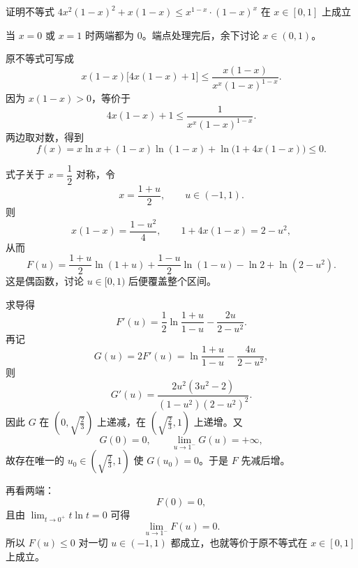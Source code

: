 \begin{example}[虚调子]
证明不等式 $4x^2(1-x)^2 + x(1-x) \leqslant x^{1-x}\cdot(1-x)^x$ 在 $x \in [0, 1]$ 上成立
\end{example}
\begin{solution}
当 \(x=0\) 或 \(x=1\) 时两端都为 \(0\)。端点处理完后，余下讨论 \(x\in(0,1)\)。

原不等式可写成
\[
x(1-x)\bigl[4x(1-x)+1\bigr]\le \frac{x(1-x)}{x^x(1-x)^{1-x}}.
\]
因为 \(x(1-x)>0\)，等价于
\[
4x(1-x)+1\le \frac1{x^x(1-x)^{1-x}}.
\]
两边取对数，得到
\[
f(x)=x\ln x+(1-x)\ln(1-x)+\ln\bigl(1+4x(1-x)\bigr)\le0.
\]

式子关于 \(x=\dfrac12\) 对称，令
\[
x=\frac{1+u}{2},\qquad u\in(-1,1).
\]
则
\[
x(1-x)=\frac{1-u^2}{4},\qquad 1+4x(1-x)=2-u^2,
\]
从而
\[
F(u)=\frac{1+u}{2}\ln(1+u)+\frac{1-u}{2}\ln(1-u)-\ln2+\ln(2-u^2).
\]
这是偶函数，讨论 \(u\in[0,1)\) 后便覆盖整个区间。

求导得
\[
F'(u)=\frac12\ln\frac{1+u}{1-u}-\frac{2u}{2-u^2}.
\]
再记
\[
G(u)=2F'(u)=\ln\frac{1+u}{1-u}-\frac{4u}{2-u^2},
\]
则
\[
G'(u)=\frac{2u^2(3u^2-2)}{(1-u^2)(2-u^2)^2}.
\]
因此 \(G\) 在 \(\left(0,\sqrt{\frac23}\right)\) 上递减，在 \(\left(\sqrt{\frac23},1\right)\) 上递增。又
\[
G(0)=0,\qquad \lim_{u\to1^-}G(u)=+\infty,
\]
故存在唯一的 \(u_0\in\left(\sqrt{\frac23},1\right)\) 使 \(G(u_0)=0\)。于是 \(F\) 先减后增。

再看两端：
\[
F(0)=0,
\]
且由 \(\lim_{t\to0^+}t\ln t=0\) 可得
\[
\lim_{u\to1^-}F(u)=0.
\]
所以 \(F(u)\le0\) 对一切 \(u\in(-1,1)\) 都成立，也就等价于原不等式在 \(x\in[0,1]\) 上成立。
\end{solution}

